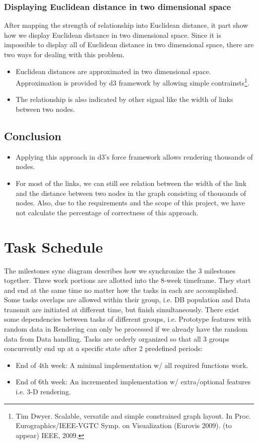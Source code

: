 \documentclass[12pt, letterpaper]{article}
\begin{document}
  \subsubsection{Displaying Euclidean distance in two dimensional space}
   After mapping the strength of relationship into Euclidean distance,
   it part show how we display Euclidean distance in two dimensional
   space. Since it is impossible to display all of Euclidean distance
   in two dimensional space, there are two ways for dealing with this
   problem.
     \begin{itemize}
       \item Euclidean distances are approximated in two dimensional
         space.  Approximation is provided by d3 framework by allowing
         simple contrainsts\footnote{Tim Dwyer. Scalable, versatile and simple constrained graph layout. In Proc. Eurographics/IEEE-VGTC Symp. on Visualization (Eurovis 2009). (to appear) IEEE, 2009.}.
       \item The relationship is also indicated by other signal like
         the width of links between two nodes.
     \end{itemize}

 \subsection{Conclusion}
   \begin{itemize}
       \item Applying this approach in d3's force framework allows
         rendering thousands of nodes. 
       \item For most of the links, we can still see relation between the width of the link
         and the distance between two nodes in the graph consisting
         of thousands of nodes. Also, due to the requirements and the
         scope of this project, we have not calculate the percentage
         of correctness of this approach.
     \end{itemize}

\section{Task Schedule}

The milestones sync diagram describes how we synchronize the 3 milestones together. Three work portions are allotted into the 8-week timeframe. They start and end at the same time no matter how the tasks in each are accomplished. Some tasks overlaps are allowed within their group, i.e. DB population and Data transmit are initiated at different time, but finish simultaneously. There exist some dependencies between tasks of different groups, i.e. Prototype features with random data in Rendering can only be processed if we already have the random data from Data handling. Tasks are orderly organized so that all 3 groups concurrently end up at a specific state after 2 predefined periods:
  \begin{itemize}
    \item End of 4th week:  A minimal implementation w/ all required functions work.
    \item End of 6th week: An incremented implementation w/ extra/optional features i.e. 3-D rendering.
  \end{itemize}
\end{document}
